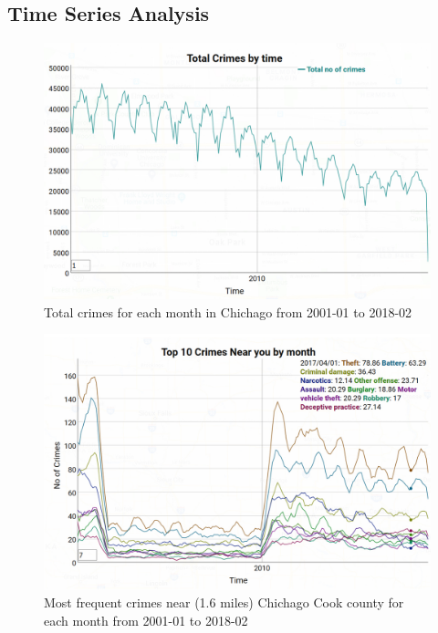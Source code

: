 \subsection{Time Series Analysis}

\begin{figure}[htb]
	\centering\includegraphics[width=\columnwidth]{../images/time1.jpg}
	\caption{Total crimes for each month in Chichago from 2001-01 to 2018-02}\label{fig:time-totalCrime}
\end{figure}

\begin{figure}[htb]
	\centering\includegraphics[width=\columnwidth]{../images/time2.jpg}
	\caption{Most frequent crimes near (1.6 miles) Chichago Cook county for each month from 2001-01 to 2018-02 }\label{fig:time-top10crimes-local}
\end{figure}

